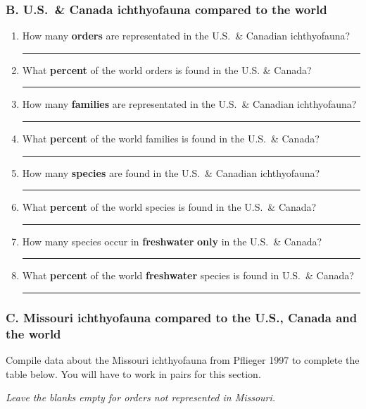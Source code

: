 \documentclass[12pt]{exam}
\newcommand{\shortblank}{\quad\rule{0.5in}{0.4pt}}
\begin{document}
\subsubsection*{B. U.S.~\& Canada ichthyofauna compared to the world}

\begin{enumerate}[resume]
\item How many \textbf{orders} are representated in the U.S.~\& Canadian ichthyofauna? \shortblank

\item What \textbf{percent} of the world orders is found in the U.S. \& Canada? \shortblank

\item How many \textbf{families} are representated in the U.S.~\& Canadian ichthyofauna? \shortblank

\item What \textbf{percent} of the world families is found in the U.S.~\& Canada? \shortblank

\item How many \textbf{species} are found in the U.S.~\& Canadian ichthyofauna? \shortblank

\item What \textbf{percent} of the world species is found in the U.S.~\& Canada? \shortblank

\item How many species occur in \textbf{freshwater} \textbf{only} in the U.S.~\&
Canada? \shortblank

\item What \textbf{percent} of the world \textbf{freshwater} species is
found in U.S.~\& Canada? \shortblank

\end{enumerate}

\newpage

\subsubsection*{C. Missouri ichthyofauna compared to the U.S., Canada and the
world}

Compile data about the Missouri ichthyofauna from Pflieger 1997 to
complete the table below. You will have to work in pairs for this section.

\emph{Leave the blanks empty for orders not represented in Missouri.}
\end{document}
